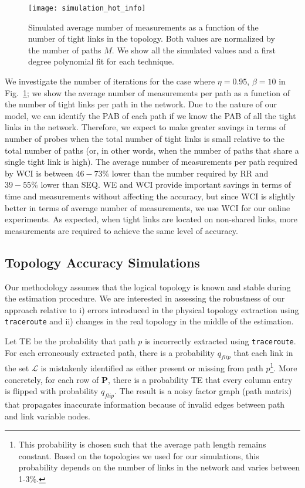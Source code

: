 \documentclass[final,5p,times,twocolumn]{elsarticle}
\begin{document}
\begin{figure}[!h]
	\centering
	\texttt{[image: simulation\_hot\_info]}
	\caption{Simulated average number of measurements as a function of the number of tight links in the topology.  Both values are normalized by the number of paths $M$.  We show all the simulated values and a first degree polynomial fit for each technique.}
	\label{fig:simulation_info}
\end{figure}

We investigate the number of iterations for the case where $\eta = 0.95$, $\beta = 10$ in Fig.~\ref{fig:simulation_info}; we show the average number of measurements per path as a function of the number of tight links per path in the network.  
Due to the nature of our model, we can identify the PAB of each path if we know the PAB of all the tight links in the network.  
Therefore, we expect to make greater savings in terms of number of probes when the total number of tight links is small relative to the total number of paths (or, in other words, when the number of paths that share a single tight link is high).  
The average number of measurements per path required by WCI is between $46-73\%$ lower than the number required by RR and $39-55\%$ lower than SEQ.
WE and WCI provide important savings in terms of time and measurements without affecting the accuracy, but since WCI is slightly better in terms of average number of measurements, we use WCI for our online experiments.  As expected, when tight links are located on non-shared links, more measurements are required to achieve the same level of accuracy.

\subsection{Topology Accuracy Simulations}
\label{ssec:robust}

Our methodology assumes that the logical topology is known and stable during the estimation procedure.  
We are interested in assessing the robustness of our approach relative to i) errors introduced in the physical topology extraction using \texttt{traceroute} 
and ii) changes in the real topology in the middle of the estimation.

Let TE be the probability that path $p$ is incorrectly extracted using \texttt{traceroute}.
For each erroneously extracted path, there is a probability $q_{flip}$ that each link in the set $\mathcal{L}$ is mistakenly identified as either present or missing from path $p$\footnote{This probability is chosen such that the average path length remains constant.  Based on the topologies we used for our simulations, this probability depends on the number of links in the network and varies between 1-3\%.}.  More concretely, for each row of $\mathbf{P}$, there is a probability TE that every column entry is flipped with probability $q_{flip}$.  The result is a noisy factor graph (path matrix) that propagates inaccurate information because of invalid edges between path and link variable nodes.
\end{document}

